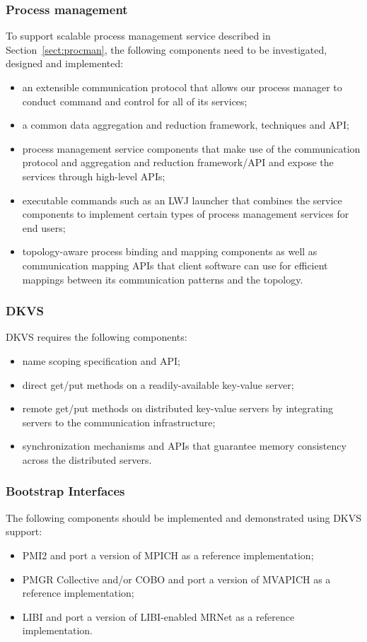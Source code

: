\subsubsection{Process management}
To support scalable process management service described in Section~\ref{sect:procman},
the following components need to be investigated, designed and implemented:
\begin{itemize}
\item{an extensible communication protocol that allows
our process manager to conduct command and control
for all of its services;}
\item{a common data aggregation and reduction framework, techniques and API;}
\item{process management service components that
make use of the communication protocol and aggregation and reduction framework/API
and expose the services through high-level APIs;}
\item{executable commands such as an LWJ launcher that combines the
service components to implement certain types of process management
services for end users;}
\item{topology-aware process binding and mapping components as well as
communication mapping APIs that client software can use for efficient
mappings between its communication patterns and the topology.}
\end{itemize}

\subsubsection{DKVS}
DKVS requires the following components:
\begin{itemize}
\item{name scoping specification and API;}
\item{direct get/put methods on a readily-available key-value server;}
\item{remote get/put methods on distributed key-value servers by
integrating servers to the communication infrastructure;}
\item{synchronization mechanisms and APIs that guarantee memory consistency
across the distributed servers.}
\end{itemize}

\subsubsection{Bootstrap Interfaces}
The following components should be implemented and demonstrated
using DKVS support:
\begin{itemize}
\item{PMI2 and port a version of MPICH as a reference implementation;}
\item{PMGR Collective and/or COBO and port a version of MVAPICH as a reference implementation;}
\item{LIBI and port a version of LIBI-enabled MRNet as a reference implementation.}
\end{itemize}

